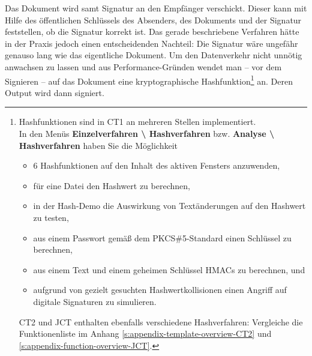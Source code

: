 \begin{refsegment}
Das Dokument wird samt Signatur an den Empfänger verschickt. Dieser kann
mit Hilfe des öffentlichen Schlüssels des Absenders, des Dokuments und
der Signatur feststellen, ob die Signatur korrekt ist.
Das gerade beschriebene Verfahren hätte in der Praxis jedoch einen
entscheidenden Nachteil: Die Signatur wäre ungefähr genauso lang wie das
eigentliche Dokument. Um den Datenverkehr nicht unnötig anwachsen zu
lassen und aus Performance-Gründen wendet man -- vor
dem Signieren -- auf das Dokument eine kryptographische
Hashfunktion\footnote{%
Hashfunktionen sind in CT1
an mehreren Stellen implementiert.\\
In den Menüs \textbf{Einzelverfahren \textbackslash{} Hashverfahren} bzw.
              \textbf{Analyse \textbackslash{} Hashverfahren}
haben Sie die Möglichkeit
\begin{itemize}[nosep,label=-]
\item 6 Hashfunktionen auf den Inhalt des aktiven Fensters anzuwenden,\\
\item für eine Datei den Hashwert zu berechnen,\\
\item in der Hash-Demo die Auswirkung von Textänderungen auf den
      Hashwert zu testen,\\
\item aus einem Passwort gemäß dem PKCS\#5-Standard
      einen Schlüssel zu berechnen,\\
\item aus einem Text und einem geheimen Schlüssel HMACs zu berechnen, und\\
\item aufgrund von gezielt gesuchten Hashwertkollisionen
      einen Angriff auf digitale Signaturen zu simulieren.
\end{itemize}
CT2 und JCT enthalten ebenfalls verschiedene
Hashverfahren: Vergleiche die Funktionenliste im Anhang
\ref{s:appendix-template-overview-CT2} und
\ref{s:appendix-function-overview-JCT}.
} an. Deren Output wird dann signiert.



\hypertarget{Hash-functions-ht}{}

\end{refsegment}

